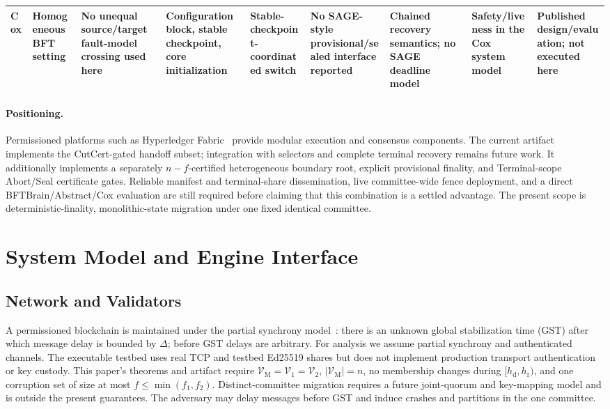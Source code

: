 \documentclass[journal]{IEEEtran}
\theoremstyle{definition}
\theoremstyle{remark}
\begin{document}
\begin{table}[t]
\begin{tabular}{L{0.075\textwidth}L{0.09\textwidth}L{0.105\textwidth}L{0.12\textwidth}L{0.105\textwidth}L{0.10\textwidth}L{0.10\textwidth}L{0.11\textwidth}L{0.095\textwidth}}
Cox~\cite{cox} & Homogeneous BFT setting & No unequal source/target fault-model crossing used here & Configuration block, stable checkpoint, core initialization & Stable-checkpoint-coordinated switch & No SAGE-style provisional/sealed interface reported & Chained recovery semantics; no SAGE deadline model & Safety/liveness in the Cox system model & Published design/evaluation; not executed here \\
\bottomrule
\end{tabular}
\end{table}

\paragraph{Positioning.}
Permissioned platforms such as Hyperledger Fabric~\cite{fabric} provide modular execution and
consensus components. The current artifact implements the CutCert-gated handoff subset; integration
with selectors and complete terminal recovery remains future work. It additionally implements a
separately $n-f$-certified heterogeneous boundary root, explicit provisional finality, and
Terminal-scope Abort/Seal certificate gates. Reliable manifest and terminal-share dissemination,
live committee-wide fence deployment, and a direct BFTBrain/Abstract/Cox
evaluation are still required before claiming that this combination is a settled advantage. The
present scope is deterministic-finality, monolithic-state migration under one fixed identical
committee.

\section{System Model and Engine Interface}
\label{sec:model}

\subsection{Network and Validators}
A permissioned blockchain is maintained under the partial synchrony model~\cite{dls}: there is
an unknown global stabilization time (GST) after which message delay is bounded by $\Delta$;
before GST delays are arbitrary. For analysis we assume partial synchrony and authenticated
channels. The executable testbed uses real TCP and testbed Ed25519 shares but does not implement
production transport authentication or key custody. This paper's theorems and artifact require
$\mathcal{V}_{\mathrm M}=\mathcal{V}_1=\mathcal{V}_2$, $|\mathcal{V}_{\mathrm M}|=n$, no membership
changes during $[h_{\mathrm d},h_{\mathrm r})$, and one corruption set of size at most
$f\le\min(f_1,f_2)$. Distinct-committee migration requires a future joint-quorum and key-mapping
model and is outside the present guarantees. The adversary may delay messages before GST and induce
crashes and partitions in the one committee.
\end{document}
